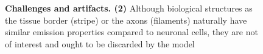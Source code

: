\begin{landscape}
\begin{figure}[ht]\ContinuedFloat
    \centering
    \caption{\textbf{Challenges and artifacts. (2)}
    Although biological structures as the tissue border (stripe) or the axons (filaments) naturally have similar emission properties compared to neuronal cells, they are not of interest and ought to be discarded by the model
    }
\end{figure}%


\end{landscape}

